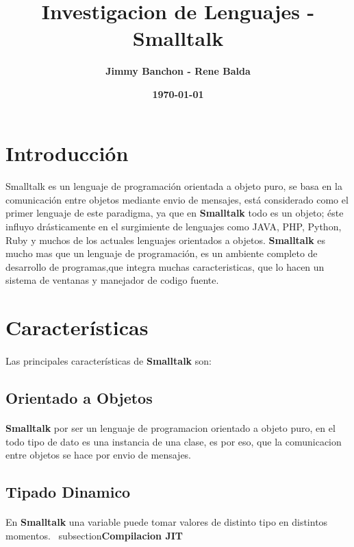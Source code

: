 \documentclass[11pt]{article}
\title{\textbf{Investigacion de Lenguajes - Smalltalk}}
\author{\textbf{Jimmy Banchon - Rene Balda}}
\date{\textbf{\today}}
\begin{document}


\maketitle
\section{\textbf{Introducción}} 
\paragraph{} \noindent
Smalltalk es un lenguaje de programación orientada a objeto puro, se basa en la comunicación entre objetos mediante envio de mensajes, está considerado como el primer lenguaje de este paradigma, ya que  en \textbf{Smalltalk} todo es un objeto; éste influyo drásticamente en el surgimiente de lenguajes como JAVA, PHP, Python, Ruby y muchos de los actuales lenguajes orientados a objetos.
 \textbf{Smalltalk} es mucho mas que un lenguaje de programación, es un ambiente completo de desarrollo de programas,que integra muchas caracteristicas, que lo hacen un sistema de ventanas y manejador de codigo fuente.
\section{\textbf{Características}}
\paragraph{} \noindent
Las principales características de  \textbf{Smalltalk} son:
\subsection{\textbf{Orientado a Objetos}}
\paragraph{} \noindent
\textbf{Smalltalk} por ser un lenguaje de programacion orientado a objeto puro, en el todo tipo de dato es una instancia de una clase, es por eso, que la comunicacion entre objetos se hace por envio de mensajes.
\subsection{\textbf{Tipado Dinamico}}
\paragraph{} \noindent
En \textbf{Smalltalk} una variable puede tomar valores de distinto tipo en distintos momentos.
\ subsection{\textbf{Compilacion JIT}}
\end{document}

